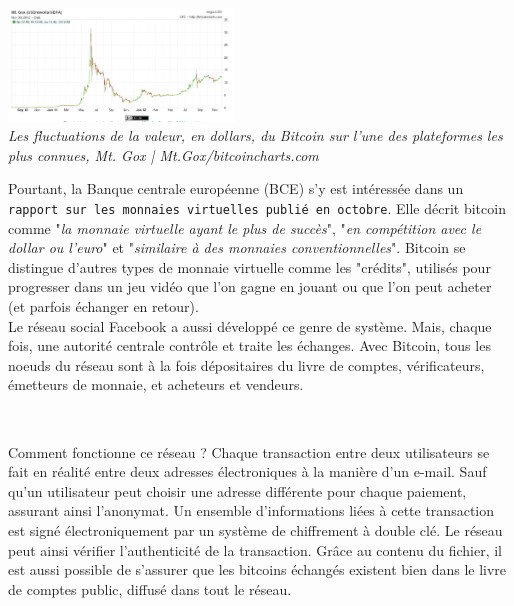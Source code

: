 \documentclass[11pt,twoside,a4paper]{article}
\begin{document}
\begin{minipage}[ht]{6.25cm}	
	\includegraphics[width=6.00cm]{img/1798258_3_a2bb_les-fluctuations-de-la-valeur-en-dollars-du_3be730c4ac7d5cf3c9b859a1a8ca9d50.png} ~\\
	\emph{Les fluctuations de la valeur, en dollars, du Bitcoin sur l'une des plateformes les plus connues, Mt. Gox | Mt.Gox/bitcoincharts.com}~\\
\end{minipage} \hfill \begin{minipage}[ht]{12.50cm}
	Pourtant, la Banque centrale europ{\'e}enne (BCE) s'y est int{\'e}ress{\'e}e dans un \texttt{rapport sur les monnaies virtuelles publi{\'e} en octobre\footnotemark}. Elle d{\'e}crit bitcoin comme "\emph{la monnaie virtuelle ayant le plus de succ{\`e}s}", "\emph{en comp{\'e}tition avec le dollar ou l'euro}" et "\emph{similaire {\`a} des monnaies conventionnelles}". Bitcoin se distingue d'autres types de monnaie virtuelle comme les "cr{\'e}dits", utilis{\'e}s pour progresser dans un jeu vid{\'e}o que l'on gagne en jouant ou que l'on peut acheter (et parfois {\'e}changer en retour). ~\\
	
	Le r{\'e}seau social Facebook a aussi d{\'e}velopp{\'e} ce genre de syst{\`e}me. Mais, chaque fois, une autorit{\'e} centrale contr{\^o}le et traite les {\'e}changes. Avec Bitcoin, tous les noeuds du r{\'e}seau sont {\`a} la fois d{\'e}positaires du livre de comptes, v{\'e}rificateurs, {\'e}metteurs de monnaie, et acheteurs et vendeurs. ~\\
\end{minipage}~\\


Comment fonctionne ce r{\'e}seau ? Chaque transaction entre deux utilisateurs se fait en r{\'e}alit{\'e} entre deux adresses {\'e}lectroniques {\`a} la mani{\`e}re d'un e-mail. Sauf qu'un utilisateur peut choisir une adresse diff{\'e}rente pour chaque paiement, assurant ainsi l'anonymat. Un ensemble d'informations li{\'e}es {\`a} cette transaction est sign{\'e} {\'e}lectroniquement par un syst{\`e}me de chiffrement {\`a} double cl{\'e}. Le r{\'e}seau peut ainsi v{\'e}rifier l'authenticit{\'e} de la transaction. Gr{\^a}ce au contenu du fichier, il est aussi possible de s'assurer que les bitcoins {\'e}chang{\'e}s existent bien dans le livre de comptes public, diffus{\'e} dans tout le r{\'e}seau. ~\\
\end{document}
